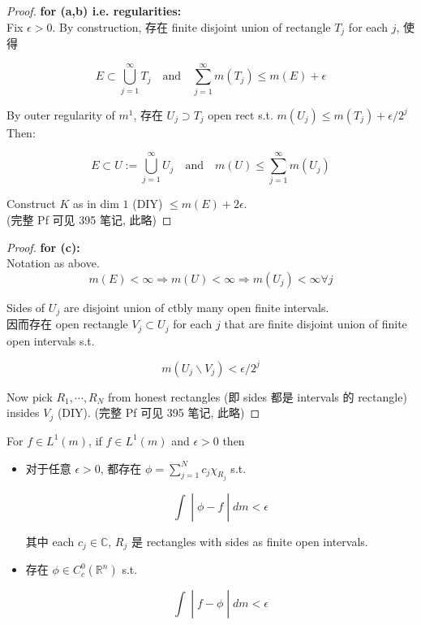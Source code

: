 \documentclass{qlnotes-export}
\begin{document}
\begin{proof}

\textbf{for (a,b) i.e. regularities:}\\
Fix \(\epsilon > 0\). By construction, 存在 finite disjoint union of rectangle \(T_{j}\) for each \(j\), 使得

\[E \subset \bigcup\limits_{j = 1}^{\infty}T_{j}\quad\text{and}\quad\sum\limits_{j = 1}^{\infty}m(T_{j}) \leq m(E) + \epsilon\]

By outer regularity of \(m^{1}\), 存在 \(U_{j} \supset T_{j}\) open rect s.t. \(m(U_{j}) \leq m(T_{j}) + \epsilon/2^{j}\) Then:

\[E \subset U := \bigcup\limits_{j = 1}^{\infty}U_{j}\quad\text{and}\quad m(U) \leq \sum\limits_{j = 1}^{\infty}m(U_{j})\]

Construct \(K\) as in dim \(1\) (DIY) \(\leq m(E) + 2\epsilon\).\\
(完整 Pf 可见 395 笔记, 此略)

\end{proof}

\begin{proof}

\textbf{for (c):}\\
Notation as above.\\

\[m(E) < \infty\Longrightarrow m(U) < \infty\Longrightarrow m(U_{j}) < \infty\forall j\]

Sides of \(U_{j}\) are disjoint union of ctbly many open finite intervals.\\
因而存在 open rectangle \(V_{j} \subset U_{j}\) for each \(j\) that are finite disjoint union of finite open intervals s.t.

\[m(U_{j}\backslash V_{j}) < \epsilon/2^{j}\]

Now pick \(R_{1},\cdots,R_{N}\) from honest rectangles (即 sides 都是 intervals 的 rectangle) insides \(V_{j}\) (DIY). (完整 Pf 可见 395 笔记, 此略)

\end{proof}

\begin{corollary}

For \(f \in L^{1}(m)\), if \(f \in L^{1}(m)\) and \(\epsilon > 0\) then

\begin{itemize}
\item
  对于任意 \(\epsilon > 0\), 都存在 \(\phi = \sum_{j = 1}^{N}c_{j}\chi_{R_{j}}\) s.t.

  \[\left. \int \middle| \phi - f \middle| dm < \epsilon \right.\]

  其中 each \(c_{j} \in {\mathbb{C}}\), \(R_{j}\) 是 rectangles with sides as finite open intervals.
\item
  存在 \(\phi \in C_{c}^{0}({\mathbb{R}}^{n})\) s.t.

  \[\left. \int \middle| f - \phi \middle| dm < \epsilon \right.\]
\end{itemize}

\end{corollary}
\end{document}
